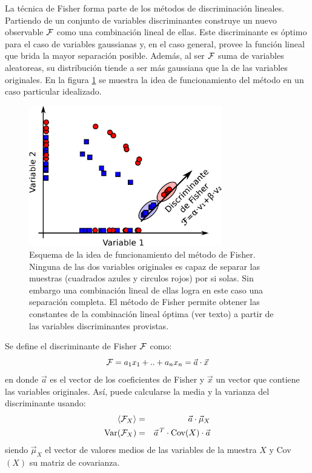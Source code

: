 	La técnica de Fisher forma parte de los métodos de discriminación lineales.
	Partiendo de un conjunto de variables discriminantes construye un nuevo observable ${\cal F}$ como una combinación lineal de ellas.
	Este discriminante es óptimo para el caso de variables gaussianas y, en el caso general, provee la función lineal que brida la mayor separación posible.
	Además, al ser ${\cal F}$ suma de variables aleatoreas, su distribución tiende a ser más gaussiana que la de las variables originales.
	En la figura \ref{fig:ideaFisher} se muestra la idea de funcionamiento del método en un caso particular idealizado.
	\begin{figure}[ht]
	\begin{center}
	\includegraphics[width=0.75\textwidth]{fig/seleccionAuger/ideaFisher}
	\caption{Esquema de la idea de funcionamiento del método de Fisher. Ninguna de las dos variables originales es capaz de separar las muestras (cuadrados azules y circulos rojos) por si solas. Sin embargo una combinación lineal de ellas logra en este caso una separación completa. El método de Fisher permite obtener las constantes de la combinación lineal óptima (ver texto) a partir de las variables discriminantes provistas.}
	\label{fig:ideaFisher}
	\end{center}
	\end{figure}

	Se define el discriminante de Fisher ${\cal F}$ como:
	\begin{equation}
	{\cal F} = a_1 x_1 + .. + a_n x_n = \vec{a}\cdot \vec{x}
	\end{equation}
	en donde $\vec{a}$ es el vector de los coeficientes de Fisher y $\vec{x}$ un vector que contiene las variables originales.
	Así, puede calcularse la media y la varianza del discriminante usando:
	\begin{eqnarray}
	\langle{\cal F}_X\rangle &=& \vec{a}\cdot\vec{\mu}_X \\
	\text{Var}({\cal F}_X)   &=& \vec{a}^{\,T} \cdot \text{Cov}(X) \cdot\vec{a}
	\end{eqnarray}
	siendo $\vec{\mu}_X$ el vector de valores medios de las variables de la muestra $X$ y Cov$(X)$ su matriz de covarianza.

